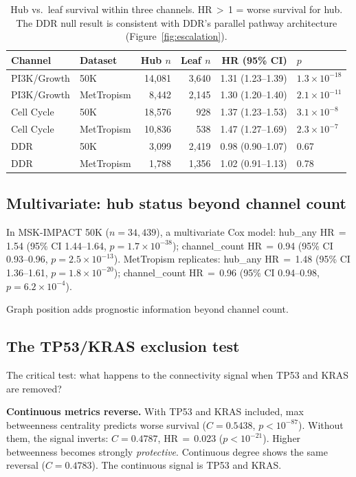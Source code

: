 \documentclass[11pt]{article}
\begin{document}
\begin{table}[ht]
\centering
\caption{Hub vs.\ leaf survival within three channels.
HR\,$>$\,1 = worse survival for hub. The DDR null result is
consistent with DDR's parallel pathway architecture
(Figure~\ref{fig:escalation}).}
\label{tab:within-channel}
\begin{tabular}{@{}llrrrl@{}}
\toprule
Channel & Dataset & Hub $n$ & Leaf $n$ & HR (95\% CI) & $p$ \\
\midrule
PI3K/Growth & 50K & 14{,}081 & 3{,}640 & 1.31 (1.23--1.39) & $1.3 \times 10^{-18}$ \\
PI3K/Growth & MetTropism & 8{,}442 & 2{,}145 & 1.30 (1.20--1.40) & $2.1 \times 10^{-11}$ \\
Cell Cycle & 50K & 18{,}576 & 928 & 1.37 (1.23--1.53) & $3.1 \times 10^{-8}$ \\
Cell Cycle & MetTropism & 10{,}836 & 538 & 1.47 (1.27--1.69) & $2.3 \times 10^{-7}$ \\
DDR & 50K & 3{,}099 & 2{,}419 & 0.98 (0.90--1.07) & 0.67 \\
DDR & MetTropism & 1{,}788 & 1{,}356 & 1.02 (0.91--1.13) & 0.78 \\
\bottomrule
\end{tabular}
\end{table}

\subsection{Multivariate: hub status beyond channel count}

In MSK-IMPACT 50K ($n = 34{,}439$), a multivariate Cox model:
hub\_any HR\,$=$\,1.54 (95\% CI 1.44--1.64,
$p = 1.7 \times 10^{-38}$); channel\_count HR\,$=$\,0.94 (95\% CI
0.93--0.96, $p = 2.5 \times 10^{-13}$). MetTropism replicates:
hub\_any HR\,$=$\,1.48 (95\% CI 1.36--1.61,
$p = 1.8 \times 10^{-20}$); channel\_count HR\,$=$\,0.96 (95\% CI
0.94--0.98, $p = 6.2 \times 10^{-4}$).

Graph position adds prognostic information beyond channel count.

\subsection{The TP53/KRAS exclusion test}

The critical test: what happens to the connectivity signal when
TP53 and KRAS are removed?

\textbf{Continuous metrics reverse.}
With TP53 and KRAS included, max betweenness centrality predicts
worse survival ($C = 0.5438$, $p < 10^{-87}$). Without them,
the signal inverts: $C = 0.4787$, HR\,$=$\,0.023 ($p < 10^{-21}$).
Higher betweenness becomes strongly \emph{protective}. Continuous
degree shows the same reversal ($C = 0.4783$). The continuous
signal is TP53 and KRAS.
\end{document}
